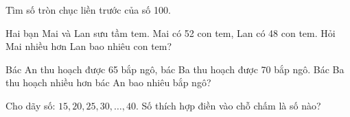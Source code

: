 \begin{ex} %
Tìm số tròn chục liền trước của số 100.
\end{ex}

\begin{ex} %
Hai bạn Mai và Lan sưu tầm tem. Mai có 52 con tem, Lan có 48 con tem. Hỏi Mai nhiều hơn Lan bao nhiêu con tem?
\end{ex}

\begin{ex} %
Bác An thu hoạch được 65 bắp ngô, bác Ba thu hoạch được 70 bắp ngô. Bác Ba thu hoạch nhiều hơn bác An bao nhiêu bắp ngô?
\end{ex}

\begin{ex} %
Cho dãy số: $15, 20, 25, 30, \dots, 40$. Số thích hợp điền vào chỗ chấm là số nào?
\end{ex}
